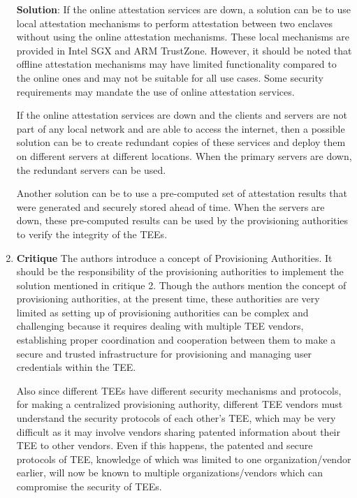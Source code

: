 \begin{enumerate}
	\textbf{Solution}: If the online attestation services are down, a solution can be to use local attestation mechanisms to perform attestation between two enclaves without using the online attestation mechanisms. These local mechanisms are provided in Intel SGX and ARM TrustZone. However, it should be noted that offline attestation mechanisms may have limited functionality compared to the online ones and may not be suitable for all use cases. Some security requirements may mandate the use of online attestation services.

	If the online attestation services are down and the clients and servers are not part of any local network and are able to access the internet, then a possible solution can be to create redundant copies of these services and deploy them on different servers at different locations. When the primary servers are down, the redundant servers can be used.

	Another solution can be to use a pre-computed set of attestation results that were generated and securely stored ahead of time. When the servers are down, these pre-computed results can be used by the provisioning authorities to verify the integrity of the TEEs.\\

	\item \textbf{Critique} The authors introduce a concept of Provisioning Authorities. It should be the responsibility of the provisioning authorities to implement the solution mentioned in critique 2. Though the authors mention the concept of provisioning authorities, at the present time, these authorities are very limited as setting up of provisioning authorities can be complex and challenging because it requires dealing with multiple TEE vendors, establishing proper coordination and cooperation between them to make a secure and trusted infrastructure for provisioning and managing user credentials within the TEE.

	Also since different TEEs have different security mechanisms and protocols, for making a centralized provisioning authority, different TEE vendors must understand the security protocols of each other’s TEE, which may be very difficult as it may involve vendors sharing patented information about their TEE to other vendors. Even if this happens, the patented and secure protocols of TEE, knowledge of which was limited to one organization/vendor earlier, will now be known to multiple organizations/vendors which can compromise the security of TEEs.\\




\end{enumerate}
